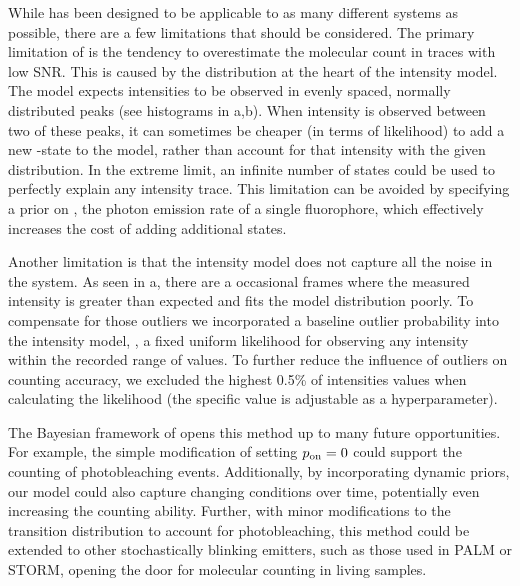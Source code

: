 While \ours has been designed to be applicable to as many different systems as
possible, there are a few limitations that should be considered.
  The primary limitation of \ours is the tendency to overestimate the molecular
  count in traces with low SNR.
  This is caused by the distribution at the heart of the intensity model. 
  The model expects intensities to be observed in evenly spaced, normally
  distributed peaks (see histograms in a,b).
  When intensity is observed between two of these peaks, it can sometimes be
  cheaper (in terms of likelihood) to add a new \z{}-state to the model, rather
  than account for that intensity with the given distribution.
  In the extreme limit, an infinite number of states could be used to perfectly
  explain any intensity trace.
  This limitation can be avoided by specifying a prior on \re, the photon
  emission rate of a single fluorophore, which effectively increases the cost
  of adding additional states.

Another limitation is that the intensity model does not capture all the noise
in the system.
    As seen in a, there are a occasional
    frames where the measured intensity is greater than expected and 
    fits the model distribution poorly.
    To compensate for those outliers we incorporated a baseline outlier
    probability into the intensity model, \ie, a fixed uniform likelihood for
    observing any intensity within the recorded range of values.
    To further reduce the influence of outliers on counting accuracy, we
    excluded the highest 0.5\% of intensities values when calculating the
    likelihood (the specific value is adjustable as a hyperparameter).

The Bayesian framework of \ours opens this method up to many future 
opportunities.
    For example, the simple modification of setting $p_\text{on}=0$ could support the
    counting of photobleaching events.
    Additionally, by incorporating dynamic priors, our model could also capture
    changing conditions over time, potentially even increasing the counting
    ability.
    Further, with minor modifications to the transition distribution to account
    for photobleaching, this method could be extended to other stochastically
    blinking emitters, such as those used in PALM or STORM, opening the door
    for molecular counting in living samples.
